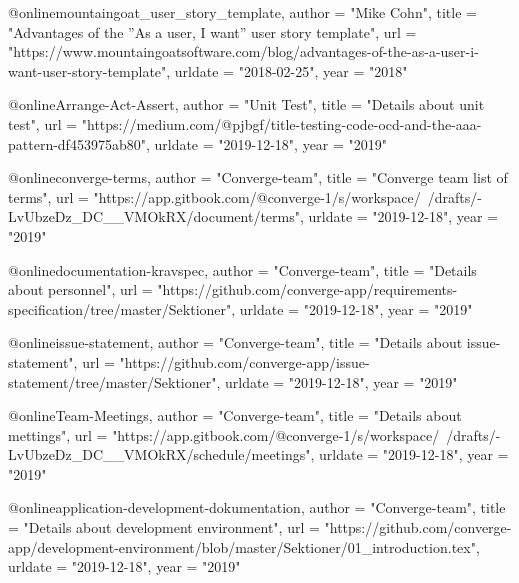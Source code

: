 
@online{mountaingoat_user_story_template,
    author = "Mike Cohn",
    title = "{Advantages of the ''As a user, I want'' user story template}",
    url = "https://www.mountaingoatsoftware.com/blog/advantages-of-the-as-a-user-i-want-user-story-template",
	urldate = "2018-02-25",
	year = "2018"
}

@online{Arrange-Act-Assert,
    author = "Unit Test",
    title = "{Details about unit test}",
    url = "https://medium.com/@pjbgf/title-testing-code-ocd-and-the-aaa-pattern-df453975ab80",
	urldate = "2019-12-18",
    year = "2019"
}

@online{converge-terms,
    author = "Converge-team",
    title = "{Converge team list of terms}",
    url = "https://app.gitbook.com/@converge-1/s/workspace/~/drafts/-LvUbzeDz_DC__VMOkRX/document/terms",
    urldate = "2019-12-18",
    year = "2019"
}

@online{documentation-kravspec,
    author = "Converge-team",
    title = "{Details about personnel}",
    url = "https://github.com/converge-app/requirements-specification/tree/master/Sektioner",
    urldate = "2019-12-18",
    year = "2019"
}

@online{issue-statement,
    author = "Converge-team",
    title = "{Details about issue-statement}",
    url = "https://github.com/converge-app/issue-statement/tree/master/Sektioner",
    urldate = "2019-12-18",
    year = "2019"
}

@online{Team-Meetings,
    author = "Converge-team",
    title = "{Details about mettings}",
    url = "https://app.gitbook.com/@converge-1/s/workspace/~/drafts/-LvUbzeDz_DC__VMOkRX/schedule/meetings",
    urldate = "2019-12-18",
    year = "2019"
}

@online{application-development-dokumentation,
    author = "Converge-team",
    title = "{Details about development environment}",
    url = "https://github.com/converge-app/development-environment/blob/master/Sektioner/01_introduction.tex",
    urldate = "2019-12-18",
    year = "2019"
}

